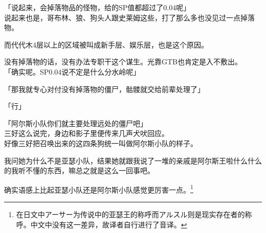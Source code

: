 「说起来，会掉落物品的怪物，给的SP值都超过了0.04呢」\\

说起来也是，哥布林、狼、狗头人跟史莱姆这些，打了那么多也没见过一点掉落物。

而代代木4层以上的区域被叫成新手层、娱乐层，也是这个原因。

没有掉落物的话，没有办法专职干这个谋生。光靠GTB也肯定是入不敷出。\\

「确实呢。SP0.04说不定是什么分水岭呢」

「那我就专心对付没有掉落物的僵尸，骷髅就交给前辈处理了」

「行」

「阿尔斯小队你们就主要处理远处的僵尸吧」\\

三好这么说完，身边和影子里便传来几声犬吠回应。\\

好像三好把召唤出来的这四条狗统一叫做阿尔斯小队的样子。

我问她为什么不是亚瑟小队，结果她就跟我说了一堆的亲戚是阿尔斯王啦什么什么的我听不懂的东西，嘛总之就是这么一回事吧。

确实语感上比起亚瑟小队还是阿尔斯小队感觉更厉害一点。\footnote{在日文中アーサー为传说中的亚瑟王的称呼而アルスル则是现实存在者的称呼。中文中没有这一差异，故译者自行进行了音译。}\\

